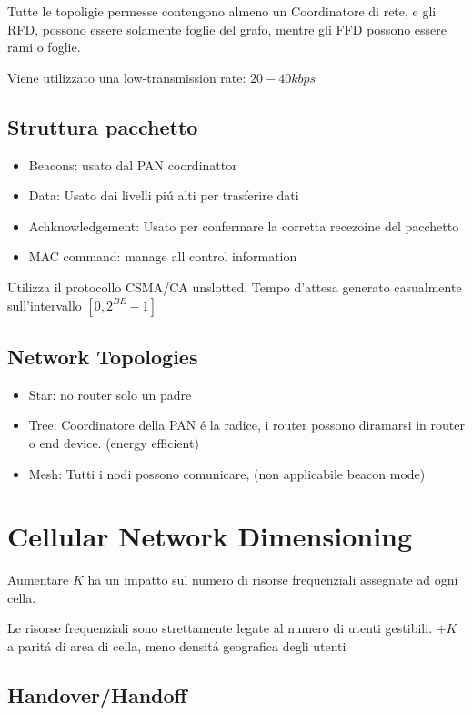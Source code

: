 \documentclass{article}
\begin{document}
Tutte le topoligie permesse contengono almeno un Coordinatore di rete, e gli RFD, possono essere solamente foglie del grafo, mentre gli FFD possono essere rami o foglie.

Viene utilizzato una low-transmission rate: $20-40 kbps$


\subsection{Struttura pacchetto}
\begin{itemize}
    \item Beacons: usato dal PAN coordinattor
    \item Data: Usato dai livelli pi\'u alti per trasferire dati
    \item Achknowledgement: Usato per confermare la corretta recezoine del pacchetto
    \item MAC command: manage all control information
\end{itemize}

Utilizza il protocollo CSMA/CA unslotted.
Tempo d'attesa generato casualmente sull'intervallo $[0, 2^{BE} - 1]$

\subsection{Network Topologies}
\begin{itemize}
    \item Star: no router solo un padre
    \item Tree: Coordinatore della PAN \'e la radice, i router possono diramarsi in router o end device. (energy efficient)
    \item Mesh: Tutti i nodi possono comunicare, (non applicabile beacon mode)
\end{itemize}

\section{Cellular Network Dimensioning}


Aumentare $K$ ha un impatto sul numero di risorse frequenziali assegnate ad ogni cella.

Le risorse frequenziali sono strettamente legate al numero di utenti gestibili.
$+K$ a parit\'a di area di cella, meno densit\'a geografica degli utenti

\subsection{Handover/Handoff}
\end{document}
